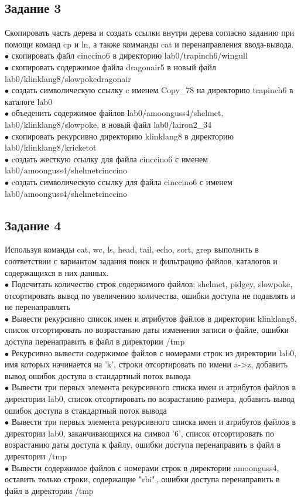 \subsection*{Задание 3}
Скопировать часть дерева и создать ссылки внутри дерева согласно заданию при помощи команд cp и ln, а также комманды cat и перенаправления ввода-вывода. \\
$\bullet$ скопировать файл cinccino6 в директорию lab0/trapinch6/wingull \\
$\bullet$ скопировать содержимое файла dragonair5 в новый файл lab0/klinklang8/slowpokedragonair \\
$\bullet$ создать символическую ссылку c именем Copy\_78 на директорию trapinch6 в каталоге lab0 \\
$\bullet$ объеденить содержимое файлов lab0/amoonguss4/shelmet, lab0/klinklang8/slowpoke, в новый файл lab0/lairon2\_34 \\
$\bullet$ скопировать рекурсивно директорию klinklang8 в директорию lab0/klinklang8/kricketot \\
$\bullet$ cоздать жесткую ссылку для файла cinccino6 с именем lab0/amoonguss4/shelmetcinccino \\
$\bullet$ cоздать символическую ссылку для файла cinccino6 с именем lab0/amoonguss4/shelmetcinccino 
\subsection*{Задание 4}
Используя команды cat, wc, ls, head, tail, echo, sort, grep выполнить в соответствии с вариантом задания поиск и фильтрацию файлов, каталогов и содержащихся в них данных. \\
$\bullet$ Подсчитать количество строк содержимого файлов: shelmet, pidgey, slowpoke, отсортировать вывод по увеличению количества, ошибки доступа не подавлять и не перенаправлять \\
$\bullet$ Вывести рекурсивно список имен и атрибутов файлов в директории klinklang8, список отсортировать по возрастанию даты изменения записи о файле, ошибки доступа перенаправить в файл в директории /tmp \\
$\bullet$ Рекурсивно вывести содержимое файлов с номерами строк из директории lab0, имя которых начинается на 'k', строки отсортировать по имени a->z, добавить вывод ошибок доступа в стандартный поток вывода \\
$\bullet$ Вывести три первых элемента рекурсивного списка имен и атрибутов файлов в директории lab0, список отсортировать по возрастанию размера, добавить вывод ошибок доступа в стандартный поток вывода \\
$\bullet$ Вывести три первых элемента рекурсивного списка имен и атрибутов файлов в директории lab0, заканчивающихся на символ '6', список отсортировать по возрастанию даты доступа к файлу, ошибки доступа перенаправить в файл в директории /tmp \\
$\bullet$ Вывести содержимое файлов с номерами строк в директории amoonguss4, оставить только строки, содержащие "rbi"\,, ошибки доступа перенаправить в файл в директории /tmp
